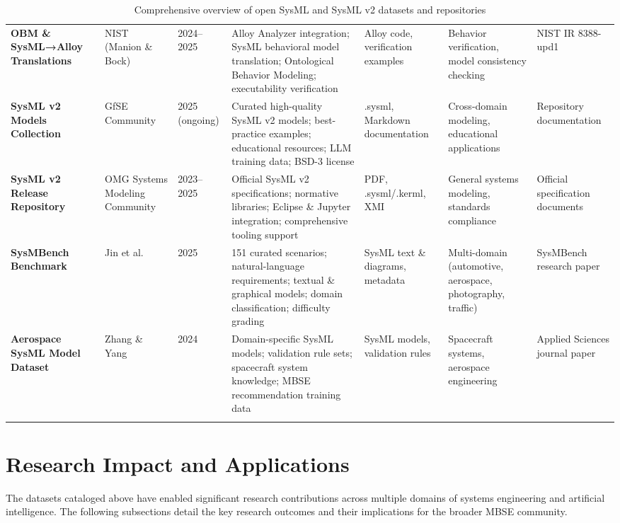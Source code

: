 \documentclass[11pt,a4paper]{article}
\begin{document}
\begin{longtable}{L{3cm}L{2.2cm}L{1.8cm}L{3.5cm}L{2cm}L{2.5cm}L{3cm}}
\textbf{OBM \& SysML→Alloy Translations} & 
NIST (Manion \& Bock) & 
2024--2025 & 
Alloy Analyzer integration; SysML behavioral model translation; Ontological Behavior Modeling; executability verification & 
Alloy code, verification examples & 
Behavior verification, model consistency checking & 
NIST IR 8388-upd1 \\

\textbf{SysML v2 Models Collection} & 
GfSE Community & 
2025 (ongoing) & 
Curated high-quality SysML v2 models; best-practice examples; educational resources; LLM training data; BSD-3 license & 
.sysml, Markdown documentation & 
Cross-domain modeling, educational applications & 
Repository documentation \\

\textbf{SysML v2 Release Repository} & 
OMG Systems Modeling Community & 
2023--2025 & 
Official SysML v2 specifications; normative libraries; Eclipse \& Jupyter integration; comprehensive tooling support & 
PDF, .sysml/.kerml, XMI & 
General systems modeling, standards compliance & 
Official specification documents \\

\textbf{SysMBench Benchmark} & 
Jin et al. & 
2025 & 
151 curated scenarios; natural-language requirements; textual \& graphical models; domain classification; difficulty grading & 
SysML text \& diagrams, metadata & 
Multi-domain (automotive, aerospace, photography, traffic) & 
SysMBench research paper \\

\textbf{Aerospace SysML Model Dataset} & 
Zhang \& Yang & 
2024 & 
Domain-specific SysML models; validation rule sets; spacecraft system knowledge; MBSE recommendation training data & 
SysML models, validation rules & 
Spacecraft systems, aerospace engineering & 
Applied Sciences journal paper \\

\bottomrule
\caption{Comprehensive overview of open SysML and SysML v2 datasets and repositories}
\label{tab:datasets}
\end{longtable}

\section{Research Impact and Applications}

The datasets cataloged above have enabled significant research contributions across multiple domains of systems engineering and artificial intelligence. The following subsections detail the key research outcomes and their implications for the broader MBSE community.
\end{document}
